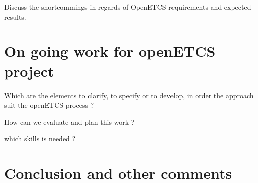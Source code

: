 \begin{todo_comment}
Discuss the shortcommings in regards of OpenETCS requirements and expected results.
\end{todo_comment}

\section{On going work for openETCS project}

\begin{todo_comment}
Which are the elements to clarify, to specify or to develop, in order the approach suit the openETCS process ?

How can we evaluate and plan this work ?

which skills is needed ?
\end{todo_comment}

\section{Conclusion and other comments}
